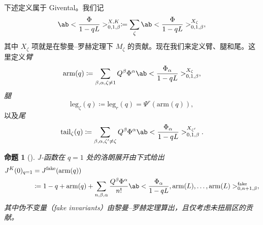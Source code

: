 \documentclass{amsart}
\newtheorem{prop}[thm]{命题}
\theoremstyle{definition}
\theoremstyle{remark}
\theoremstyle{plain}
\theoremstyle{definition}
\theoremstyle{remark}
\newcommand{\mr}[1]{\mathrm{#1}}
\newcommand{\1}{\mathbf{1}}
\newcommand{\2}{\mathbf{2}}
\newcommand{\3}{\mathbf{3}}
\begin{document}
%
%

下述定义属于 Givental。我们记
\[ \ab<\frac{\Phi}{1-qL}>_{0,1,\beta}^{X,K} \coloneqq \sum_{\zeta} \ab<\frac{\Phi}{1-qL}>_{0,1,\beta}^{X_{\zeta}}, \]
其中 \(X_{\zeta}\) 项就是在黎曼--罗赫定理下 \(M_{\zeta}\) 的贡献。现在我们来定义臂、腿和尾。这里定义\textit{臂}
\[ \mr{arm}(q) \coloneqq \sum_{\beta, \alpha, \zeta \neq 1} Q^{\beta} \Phi^{\alpha}\ab<\frac{\Phi_{\alpha}}{1-qL}>_{0,1,\beta}^{X_{\zeta}}, \]
\textit{腿}
\[ \mr{leg}_{\zeta}(q) \coloneqq \mr{leg}_r(q) = \Psi^r (\mr{arm}(q)), \]
以及\textit{尾}
\[ \mr{tail}_{\zeta}(q) \coloneqq \sum_{\beta, \alpha, \zeta' \neq \zeta} Q^{\beta} \Phi^{\alpha} \ab<\frac{\Phi_{\alpha}}{1-qL}>_{0,1,\beta}^{X_{\zeta'}}. \]

\begin{prop}[{\cite{GiventalTonita2014}}]
    J-函数在 \(q = 1\) 处的洛朗展开由下式给出
    \begin{align*}
        J^K(0)_{q=1} &= J^{\mr{fake}}(\mr{arm}(q)) \\
        &\coloneqq 1-q + \mr{arm}(q) + \sum_{n,\beta,\alpha} \frac{Q^{\beta}\Phi^{\alpha}}{n!} \ab<\frac{\Phi_{\alpha}}{1-qL}, \mr{arm}(L), \ldots, \mr{arm}(L)>_{0,n+1,\beta}^{\mr{fake}},
    \end{align*}
    其中伪不变量（fake invariants）由黎曼--罗赫定理算出，且仅考虑未扭扇区的贡献。
\end{prop}
\end{document}

